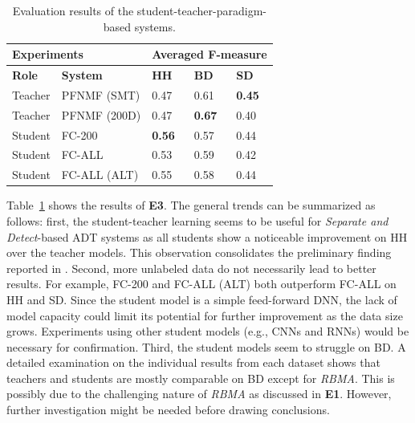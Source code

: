 \documentclass{article}
\newcommand{\comment}[1]{{\textcolor{blue}{#1}}}
\begin{document}
\begin{table}[]
\centering
\begin{tabularx}{\columnwidth}{XXXXX}
\hline
\multicolumn{2}{l}{\textbf{Experiments}}                    & \multicolumn{3}{l}{\textbf{Averaged F-measure}} \\ \hline
\textbf{Role} & \multicolumn{1}{l|}{\textbf{System}}        & \textbf{HH}    & \textbf{BD}    & \textbf{SD}   \\ \hline
Teacher       & \multicolumn{1}{l|}{PFNMF (SMT)}            & 0.47           & 0.61           & \textbf{0.45} \\
Teacher       & \multicolumn{1}{l|}{PFNMF (200D)}           & 0.47           & \textbf{0.67}  & 0.40          \\
Student       & \multicolumn{1}{l|}{FC-200}                & \textbf{0.56}  & 0.57           & 0.44          \\
Student       & \multicolumn{1}{l|}{FC-ALL}               & 0.53           & 0.59           & 0.42          \\
Student       & \multicolumn{1}{l|}{FC-ALL (ALT)} & 0.55           & 0.58           & 0.44          \\ \hline
\end{tabularx}
\caption{Evaluation results of the student-teacher-paradigm-based systems.}%
\label{tab:e3result}
\end{table}


Table~\ref{tab:e3result} shows the results of \textbf{E3}. The general trends can be summarized as follows: first, the student-teacher learning seems to be useful for \textit{Separate and Detect}-based ADT systems as all students show a noticeable improvement on HH over the teacher models. This observation consolidates the preliminary finding reported in \cite{Wu2017}. Second, more unlabeled data do not necessarily lead to better results. For example, FC-200 and FC-ALL (ALT) both outperform FC-ALL on HH and SD. 
Since the student model is a simple feed-forward DNN, the lack of model capacity could limit its potential for further improvement as the data size grows. Experiments using other student models (e.g., CNNs and RNNs) would be necessary for confirmation.   
Third, the student models seem to struggle on BD. A detailed examination on the individual results from each dataset shows that teachers and students are mostly comparable on BD except for \textit{RBMA}. This is possibly due to the challenging nature of \textit{RBMA} as discussed in \textbf{E1}. However, further investigation might be needed before drawing conclusions. %
\end{document}
